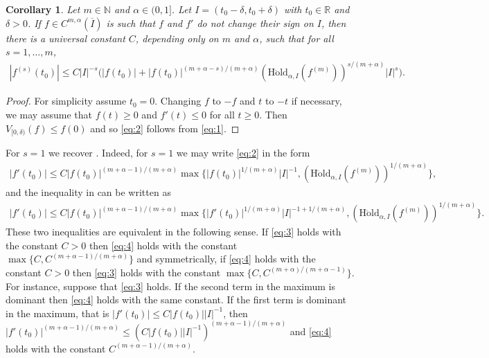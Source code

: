 \documentclass[12pt]{amsart}
\theoremstyle{plain}
\newtheorem{corollary}{Corollary}
\theoremstyle{definition}
\numberwithin{equation}{section}
\let\on=\operatorname
\begin{document}
\begin{corollary}
  Let $m \in {\mathbb{N}}$ and ${\alpha} \in (0,1]$.
  Let $I = (t_0- {\delta},t_0+{\delta})$ with $t_0 \in {\mathbb{R}}$ and ${\delta}>0$.
  If $f\in C^{m,{\alpha}}(\overline I)$ is such that $f$ and $f'$ do not change their sign on $I$,
  then there is a universal constant $C$, depending only on $m$ and ${\alpha}$, such that for all $s = 1,\ldots,m$,
  \begin{align}\label{eq:2}  
    |f^{(s)}(t_0) | \le C |I|^{-s} \bigl(|f(t_0)| + |f(t_0)|^{(m+{\alpha}-s)/(m+{\alpha})} ({\on{H\ddot{o}ld}}_{{\alpha},I}(f^{(m)}))^{s/(m+{\alpha})}  |I|^s
    \bigr) .  
  \end{align}
\end{corollary}

\begin{proof}
  For simplicity assume $t_0=0$.
  Changing $f$ to $-f$ and $t$ to $-t$ if necessary, we may assume that $f(t) \ge 0$ and $f'(t)\le 0$ for all $t \ge 0$.
  Then $V_{[0,{\delta})}(f) \le f(0)$ and so \eqref{eq:2} follows from \eqref{eq:1}.
\end{proof}

For $s=1$ we recover \cite[Prop.~3.4]{GhisiGobbino13}. Indeed, for $s =1$ we may write \eqref{eq:2} in the form 
\begin{align} \label{eq:3}   
    |f'(t_0) | \le C  |f(t_0)|^{(m+{\alpha}-1)/(m+{\alpha})} \max\bigl\{|f(t_0)|^{1/(m+{\alpha})} |I|^{-1}, ({\on{H\ddot{o}ld}}_{{\alpha},I}(f^{(m)}))^{1/(m+{\alpha})}  \bigr\},  
\end{align}
and the inequality in \cite[Prop.~3.4]{GhisiGobbino13} can be written as 
\begin{align} \label{eq:4}  
    |f'(t_0) | \le C  |f(t_0)|^{(m+{\alpha}-1)/(m+{\alpha})} 
    \max\bigl\{|f'(t_0)|^{1/(m+{\alpha})} |I|^{-1+1/(m+{\alpha})}, ({\on{H\ddot{o}ld}}_{{\alpha},I}(f^{(m)}))^{1/(m+{\alpha})}  \bigr\}.  
\end{align}
These two inequalities are equivalent in the following sense.  
 If \eqref{eq:3} holds with the constant $C>0$ then \eqref{eq:4} holds with the constant 
 $\max \{C,C^{(m+{\alpha}-1)/(m+{\alpha})}\}$ and 
 symmetrically,  if \eqref{eq:4} holds with the constant $C>0$ then \eqref{eq:3} holds with the constant 
 $\max \{C,C^{(m+{\alpha})/(m+{\alpha}-1)}\}$.  For instance, suppose that \eqref{eq:3} holds.  
 If the second term in the maximum is dominant then \eqref{eq:4} holds with the same constant.  If the first term is dominant in the 
 maximum, that is $|f'(t_0)| \le C |f(t_0)| |I|^{-1}$, then $|f'(t_0)| ^{(m+{\alpha}-1)/(m+{\alpha})} \le (C
  |f(t_0)| |I|^{-1})^{(m+{\alpha}-1)/(m+{\alpha})}$ and \eqref{eq:4} holds 
  with the constant  $C^{(m+{\alpha}-1)/(m+{\alpha})}$.    
\end{document}
